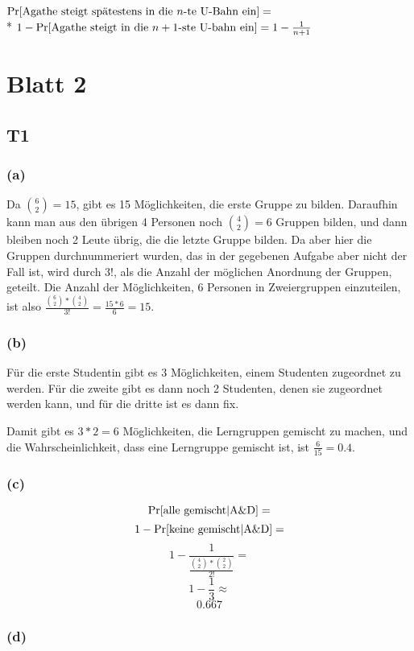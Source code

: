 \documentclass{article}
\begin{document}
$ \Pr[\hbox{Agathe steigt spätestens in die $n$-te U-Bahn ein}]=$\\*
$ 1-\Pr[\hbox{Agathe steigt in die $n+1$-ste U-bahn ein}]=1-\frac{1}{n+1} $

\section*{Blatt 2}

\subsection*{T1}

\subsubsection*{(a)}

Da ${6 \choose 2}=15$, gibt es 15 Möglichkeiten, die erste Gruppe
zu bilden. Daraufhin kann man aus den übrigen 4 Personen noch ${4 \choose 2}=6$
Gruppen bilden, und dann bleiben noch 2 Leute übrig, die die
letzte Gruppe bilden. Da aber hier die Gruppen durchnummeriert wurden,
das in der gegebenen Aufgabe aber nicht der Fall ist, wird durch $3!$,
als die Anzahl der möglichen Anordnung der Gruppen, geteilt.  Die Anzahl
der Möglichkeiten, 6 Personen in Zweiergruppen einzuteilen, ist also
$\frac{{6 \choose 2}*{4 \choose 2}}{3!}=\frac{15*6}{6}=15$.

\subsubsection*{(b)}

Für die erste Studentin gibt es 3 Möglichkeiten, einem Studenten
zugeordnet zu werden. Für die zweite gibt es dann noch 2 Studenten,
denen sie zugeordnet werden kann, und für die dritte ist es dann fix.

Damit gibt es $3*2=6$ Möglichkeiten, die Lerngruppen gemischt zu machen,
und die Wahrscheinlichkeit, dass eine Lerngruppe gemischt ist, ist
$\frac{6}{15}=0.4$.

\subsubsection*{(c)}

$$\Pr[\hbox{alle gemischt}|\hbox{A\&D}]=$$
$$1-\Pr[\hbox{keine gemischt}|\hbox{A\&D}]=$$
$$1-\frac{1}{\frac{{4 \choose 2}*{2 \choose 2}}{2!}}=$$
$$1-\frac{1}{3}\approx$$
$$0.667$$

\subsubsection*{(d)}
\end{document}
